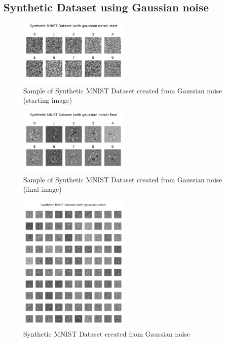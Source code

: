 \documentclass[conference, compsoc]{IEEEtran}
\begin{document}
\subsection{Synthetic Dataset using Gaussian noise}
\begin{figure}[H]
	\centering
	\includegraphics[width=0.48\textwidth]{mnist_noise_sample.png}
	\caption{Sample of Synthetic MNIST Dataset created from Gaussian noise (starting image)}
	\label{fig:mnist_noise_sample}
\end{figure}

\begin{figure}[H]
	\centering
	\includegraphics[width=0.48\textwidth]{mnist_noise_syn.png}
	\caption{Sample of Synthetic MNIST Dataset created from Gaussian noise (final image)}
	\label{fig:mnist_noise_syn}
\end{figure}

\begin{figure}[H]
	\centering
	\includegraphics[width=0.48\textwidth]{mnist_noise_syn_all.png}
	\caption{Synthetic MNIST Dataset created from Gaussian noise}
	\label{fig:mnist_noise_syn_all}
\end{figure}
\end{document}
